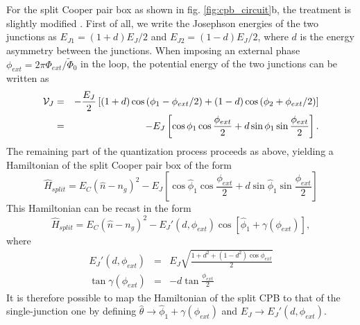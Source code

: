 \smallskip

For the split Cooper pair box as shown in fig. \ref{fig:cpb_circuit}b, the treatment is slightly modified \citep{cottet_implementation_2002}. First of all, we write the Josephson energies of the two junctions as $E_{J1}=(1+d)E_J/2$ and $E_{J2}=(1-d)E_J/2$, where $d$ is the energy asymmetry between the junctions. When imposing an external phase $\phi_{ext}=2\pi\Phi_{ext}/\tilde{\Phi}_0$ in the loop, the potential energy of the two junctions can be written as
%
\begin{eqnarray}
\begin{mathcal}V\end{mathcal}_J & = & -\frac{E_J}{2}\left[(1+d)\cos{(\phi_1-\phi_{ext}/2)}+(1-d)\cos{(\phi_2+\phi_{ext}/2)} \right] \\
& = & -E_J\left[\cos{\phi_1}\cos{\frac{\phi_{ext}}{2}}+d\sin{\phi_1}\sin{\frac{\phi_{ext}}{2}}\right].
\end{eqnarray}
%
The remaining part of the quantization process proceeds as above, yielding a Hamiltonian of the split Cooper pair box of the form
%
\begin{equation}
\hat{H}_{split} = E_C(\hat{n}-n_g)^2-E_J\left[\cos{\hat{\phi}_1}\cos{\frac{\phi_{ext}}{2}}+d\sin{\hat{\phi}_1}\sin{\frac{\phi_{ext}}{2}}\right]
\end{equation}
%
This Hamiltonian can be recast in the form \citep{cottet_implementation_2002}
%
\begin{equation}
\hat{H}_{split} = E_C(\hat{n}-n_g)^2-E_J'(d,\phi_{ext})\cos{[\hat{\phi}_1+\gamma(\phi_{ext})]},
\end{equation}
%
where
%
\begin{eqnarray}
E_J'(d,\phi_{ext}) & = & E_J\sqrt{\frac{1+d^2+(1-d^2)\cos{\phi_{ext}}}{2}} \\
\tan{\gamma(\phi_{ext})} & = & -d\tan{\frac{\phi_{ext}}{2}}
\end{eqnarray}
%
It is therefore possible to map the Hamiltonian of the split CPB to that of the single-junction one by defining $\hat{\theta}\to\hat{\phi}_1+\gamma(\phi_{ext})$ and $E_J\to E_J'(d,\phi_{ext})$. 

